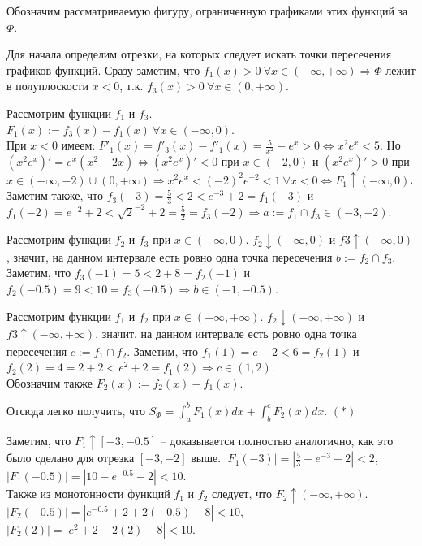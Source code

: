 \documentclass[a4paper,12pt,titlepage,finall]{article}
\begin{document}
Обозначим рассматриваемую фигуру, ограниченную графиками этих функций за $\Phi$.
\par
Для начала определим отрезки, на которых следует искать точки пересечения графиков функций. Сразу заметим, что $f_1(x) > 0 \ \forall x \in (-\infty, +\infty) \Longrightarrow \Phi$ лежит в полуплоскости $x < 0$, т.к. $f_3(x) > 0 \ \forall x \in (0, +\infty)$.
\par
Рассмотрим функции $f_1$ и $f_3$. \\$F_1(x) := f_3(x)-f_1(x) \ \forall x \in (-\infty, 0)$. \\При $x < 0$ имеем:
$F'_1(x) = f'_3(x)-f'_1(x) = \frac{5}{x^2}-e^x > 0 \Leftrightarrow x^2e^x < 5$. Но $(x^2e^x)' = e^x(x^2+2x) \Leftrightarrow (x^2e^x)' < 0$ при $x \in (-2, 0)$ и $(x^2e^x)' > 0$ при $x \in (-\infty,-2)\cup(0,+\infty ) \Longrightarrow x^2e^x < (-2)^2e^{-2} < 1\  \forall x < 0 \Leftrightarrow F_1 \uparrow (-\infty,0)$. Заметим также, что $f_3(-3) = \frac{5}{3} < 2 < e^{-3} + 2 = f_1(-3)$ и $f_1(-2) = e^{-2}+2 < \sqrt{2}^{-2}+2 = \frac{5}{2} = f_3(-2) \Longrightarrow a := f_1\cap f_3 \in (-3, -2)$.
\par
Рассмотрим функции $f_2$ и $f_3$ при $x \in (-\infty, 0)$. $f_2 \downarrow (-\infty , 0)$ и $f3 \uparrow (-\infty, 0)$, значит, на данном интервале есть ровно одна точка пересечения $b := f_2\cap f_3$. Заметим, что $f_3(-1) = 5 < 2+8 = f_2(-1)$ и $f_2(-0.5) = 9 < 10 = f_3(-0.5) \Longrightarrow b \in  (-1, -0.5)$.
\par
Рассмотрим функции $f_1$ и $f_2$ при $x \in (-\infty, +\infty)$. $f_2 \downarrow (-\infty , +\infty)$ и $f3 \uparrow (-\infty, +\infty)$, значит, на данном интервале есть ровно одна точка пересечения $c := f_1\cap f_2$. Заметим, что $f_1(1) = e+2 < 6 = f_2(1)$ и $f_2(2) = 4 = 2+2 < e^2+2 = f_1(2) \Longrightarrow c \in (1, 2)$. \\Обозначим также $F_2(x) := f_2(x)-f_1(x)$.
\par
Отсюда легко получить, что $S_\Phi = \int_{a}^{b}F_{1}(x)dx+\int_{b}^{c}F_{2}(x)dx$. $(*)$\\
\par
Заметим, что $F_1 \uparrow \left[ -3, -0.5 \right] $ -- доказывается полностью аналогично, как это было сделано для отрезка $\left[ -3, -2 \right]$ выше. $\left|F_1(-3)\right| = \left|  \frac{5}{3} - e^{-3}-2\right| < 2$, $\left|F_1(-0.5)\right| = \left|10 - e^{-0.5}-2\right| < 10$.\\
Также из монотонности функций $f_1$ и $f_2$ следует, что $F_2 \uparrow (-\infty, +\infty )$. $\left|F_2(-0.5)\right| = \left|e^{-0.5}+2+2(-0.5)-8\right| < 10$, $\left|F_2(2)\right| = \left|e^{2}+2+2(2)-8\right| < 10$.\\
\end{document}
